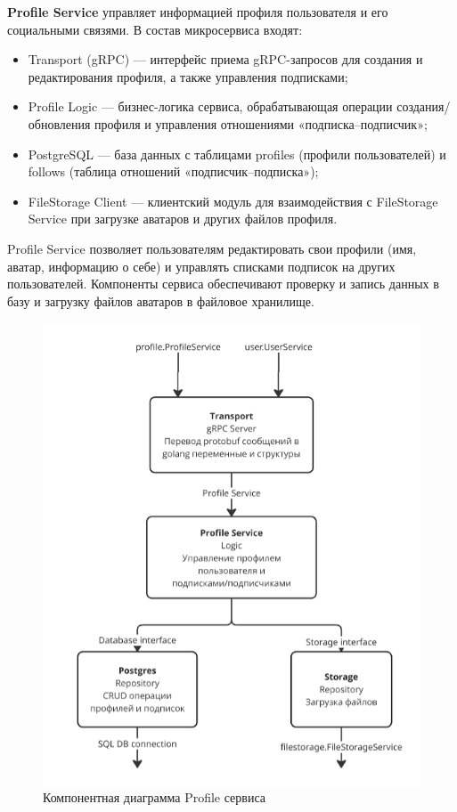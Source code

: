 \textbf{Profile Service} управляет информацией профиля пользователя и его социальными связями. В состав микросервиса входят:
\begin{itemize}
    \item Transport (gRPC) — интерфейс приема gRPC-запросов для создания и редактирования профиля, а также управления подписками;
    \item Profile Logic — бизнес-логика сервиса, обрабатывающая операции создания/обновления профиля и управления отношениями «подписка–подписчик»;
    \item PostgreSQL — база данных с таблицами profiles (профили пользователей) и follows (таблица отношений «подписчик–подписка»);
    \item FileStorage Client — клиентский модуль для взаимодействия с FileStorage Service при загрузке аватаров и других файлов профиля.
\end{itemize}
\noindent Profile Service позволяет пользователям редактировать свои профили (имя, аватар, информацию о себе) и управлять списками подписок на других пользователей. Компоненты сервиса обеспечивают проверку и запись данных в базу и загрузку файлов аватаров в файловое хранилище.
\begin{figure}[H]
        \centering
        \includegraphics[width=0.8\linewidth]{Images/second_chapter_backend_architecture/Picture4.png}
        \caption{Компонентная диаграмма Profile сервиса}
        \label{fig:profile-service-component-diagram}
\end{figure}

